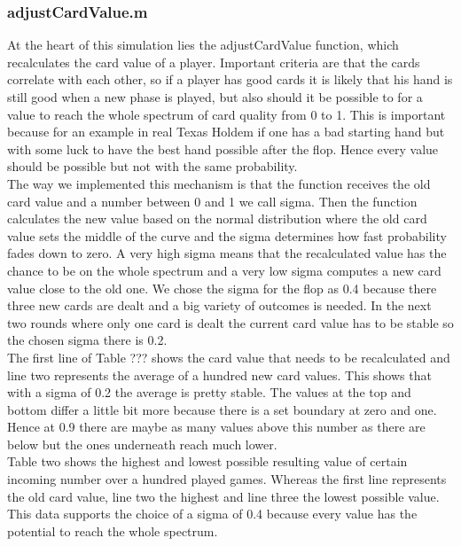 \documentclass[11pt]{article}
\begin{document}
\subsubsection{adjustCardValue.m}
At the heart of this simulation lies the adjustCardValue function, which recalculates the card value of a player. Important criteria are that the cards correlate with each other, so if a player has good cards it is likely that his hand is still good when a new phase is played, but also should it be possible to for a value to reach the whole spectrum of card quality from 0 to 1. This is important because for an example in real Texas Holdem if one has a bad starting hand but with some luck to have the best hand possible after the flop. Hence every value should be possible but not with the same probability.\\
The way we implemented this mechanism is that the function receives the old card value and a number between 0 and 1 we call sigma. Then the function calculates the new value based on the normal distribution where the old card value sets the middle of the curve and the sigma determines how fast probability fades down to zero. A very high sigma means that the recalculated value has the chance to be on the whole spectrum and a very low sigma computes a new card value close to the old one.
We chose the sigma for the flop as 0.4 because there three new cards are dealt and a big variety of outcomes is needed. In the next two rounds where only one card is dealt the current card value has to be stable so the chosen sigma there is 0.2.\\
The first line of Table ??? shows the card value that needs to be recalculated and line two represents the average of a hundred new card values. This shows that with a sigma of 0.2 the average is pretty stable. The values at the top and bottom differ a little bit more because there is a set boundary at zero and one. Hence at 0.9 there are maybe as many values above this number as there are below but the ones underneath reach much lower.\\
Table two shows the highest and lowest possible resulting value of certain incoming number over a hundred played games. Whereas the first line represents the old card value, line two the highest and line three the lowest possible value. This data supports the choice of a sigma of 0.4 because every value has the potential to reach the whole spectrum.
\end{document}
